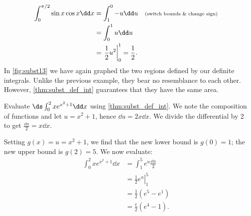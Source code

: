 \begin{example}
%
\begin{align*}
	\int_0^{\pi/2} \sin x\cos x\dd x
	&= \int_1^0 -u\dd u && \text{\scriptsize (switch bounds \& change sign)}\\
	&= \int_0^1 u\dd u\\
	&= \left.\frac12u^2\right|_0^1= \frac12.
\end{align*}
In \autoref{fig:subst13} we have again graphed the two regions defined by our definite integrals. Unlike the previous example, they bear no resemblance to each other. However, \autoref{thm:subst_def_int} guarantees that they have the same area.
\end{example}

\begin{example}\label{ex_subst_def_3}%
Evaluate $\ds\int_0^2 xe^{x^2+1}\dd x$ using \autoref{thm:subst_def_int}.
\solution
We note the composition of functions and let $u=x^2+1$, hence $\dd u=2x\dd x$. We divide the differential by 2 to get $\frac{\dd u}2=x\dd x$.

Setting $g(x)=u=x^2+1$, we find that the new lower bound is $g(0)=1$; the new upper bound is $g(2)=5$. We now evaluate:
\begin{align*}
	\int_0^2 xe^{x^2+1}\dd x
	&= \int_1^5 e^u \frac{\dd u}2\\
	&= \left.\frac12 e^u\right|_1^5\\
	&= \frac12(e^5-e^1) \\
	&= \frac e2(e^4-1). %
\end{align*}
\end{example}



